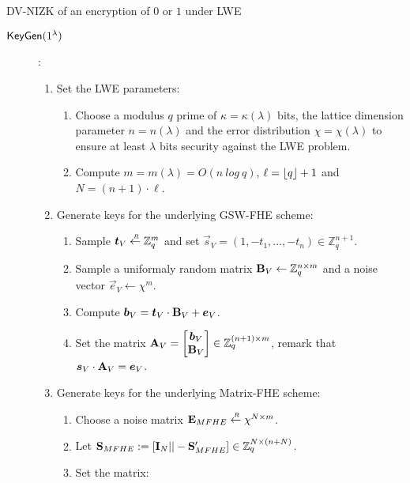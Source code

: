 


\begin{subsection}{DV-NIZK of an encryption of $0$ or $1$ under LWE}
    
    \begin{description}
    \item[${\mathsf{KeyGen}}(1^\lambda)$]:
      \begin{enumerate}
      \item Set the LWE parameters:
        \begin{enumerate}
        \item Choose a modulus $q$ prime of $\kappa = \kappa(\lambda)$ bits, the lattice dimension parameter $n = n(\lambda)$ and the error distribution $\chi = \chi(\lambda)$ to ensure at least $\lambda$ bits security against the LWE problem.
        \item Compute $m = m(\lambda) = O(n~log~q)$, $\ell = \lfloor q\rfloor+1$ and $N = (n+1) \cdot \ell$.
        \end{enumerate}
      \item Generate keys for the underlying GSW-FHE scheme:
        \begin{enumerate}
        \item Sample $\vec{t}_V \sample \mathbb{Z}_q^m$ and set $\vec{s}_V = (1, -t_1, \dots, -t_n) \in \mathbb{Z}_q^{n+1}$.
        \item Sample a uniformaly random matrix $\mathbf{B}_V \gets \mathbb{Z}_q^{n \times m}$ and a noise vector $\vec{e}_V \gets \chi^m$.
        \item Compute $\vec{b}_V = \vec{t}_V \cdot \mat{B}_V  + \vec{e}_V$.
        \item Set the matrix $\mat{A}_V = \begin{bmatrix}\vec{b}_V \\ \mat{B}_V \end{bmatrix} \in \mathbb{Z}_q^{(n+1) \times m}$, remark that $\vec{s}_V \cdot \mat{A}_V = \vec{e}_V$.
        \end{enumerate}
      \item Generate keys for the underlying Matrix-FHE scheme:
        \begin{enumerate}
        \item Choose a noise matrix $\mathbf{E}_{MFHE} \stackrel{{\scriptscriptstyle \mkern4mu R}}{\gets} \chi^{N \times m}$.
        \item Let $\mathbf{S}_{MFHE}:= [\mathbf{I}_N || - \mathbf{S}_{MFHE}'] \in \mathbb{Z}_q^{N \times (n+N)}$.
        \item Set the matrix:
          \begin{align*}

\end{align*}
\end{enumerate}
\end{enumerate}
\end{description}
\end{subsection}
